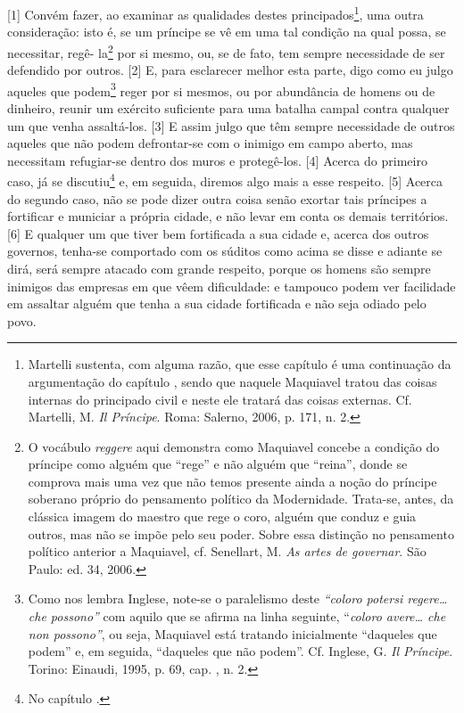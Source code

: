 {[}1{]} Convém fazer, ao examinar as qualidades destes
principados\footnote{Martelli sustenta, com alguma razão, que esse
  capítulo é uma continuação da argumentação do capítulo , sendo que
  naquele Maquiavel tratou das coisas internas do principado civil e
  neste ele tratará das coisas externas. Cf. Martelli, M. \emph{Il
  Príncipe}. Roma: Salerno, 2006, p. 171, n. 2.}, uma outra
consideração: isto é, se um príncipe se vê em uma tal condição na qual
possa, se necessitar, regê- la\footnote{O vocábulo \emph{reggere} aqui
  demonstra como Maquiavel concebe a condição do príncipe como alguém
  que ``rege'' e não alguém que ``reina'', donde se comprova mais uma
  vez que não temos presente ainda a noção do príncipe soberano próprio
  do pensamento político da Modernidade. Trata-se, antes, da clássica
  imagem do maestro que rege o coro, alguém que conduz e guia outros,
  mas não se impõe pelo seu poder. Sobre essa distinção no pensamento
  político anterior a Maquiavel, cf. Senellart, M. \emph{As artes de
  governar}. São Paulo: ed. 34, 2006.} por si mesmo, ou, se de fato, tem
sempre necessidade de ser defendido por outros. {[}2{]} E, para
esclarecer melhor esta parte, digo como eu julgo aqueles que
podem\footnote{Como nos lembra Inglese, note-se o paralelismo deste
  \emph{``coloro potersi regere\ldots{} che possono''} com aquilo que se
  afirma na linha seguinte, ``\emph{coloro avere\ldots{} che non possono''},
  ou seja, Maquiavel está tratando inicialmente ``daqueles que podem''
  e, em seguida, ``daqueles que não podem''. Cf. Inglese, G. \emph{Il
  Príncipe}. Torino: Einaudi, 1995, p. 69, cap. , n. 2.} reger por si
mesmos, ou por abundância de homens ou de dinheiro, reunir um exército
suficiente para uma batalha campal contra qualquer um que venha
assaltá-los. {[}3{]} E assim julgo que têm sempre necessidade de outros
aqueles que não podem defrontar-se com o inimigo em campo aberto, mas
necessitam refugiar-se dentro dos muros e protegê-los. {[}4{]} Acerca do
primeiro caso, já se discutiu\footnote{No capítulo .} e, em seguida,
diremos algo mais a esse respeito. {[}5{]} Acerca do segundo caso, não
se pode dizer outra coisa senão exortar tais príncipes a fortificar e
municiar a própria cidade, e não levar em conta os demais territórios.
{[}6{]} E qualquer um que tiver bem fortificada a sua cidade e, acerca
dos outros governos, tenha-se comportado com os súditos como acima se
disse e adiante se dirá, será sempre atacado com grande respeito, porque
os homens são sempre inimigos das empresas em que vêem dificuldade: e
tampouco podem ver facilidade em assaltar alguém que tenha a sua cidade
fortificada e não seja odiado pelo povo.

